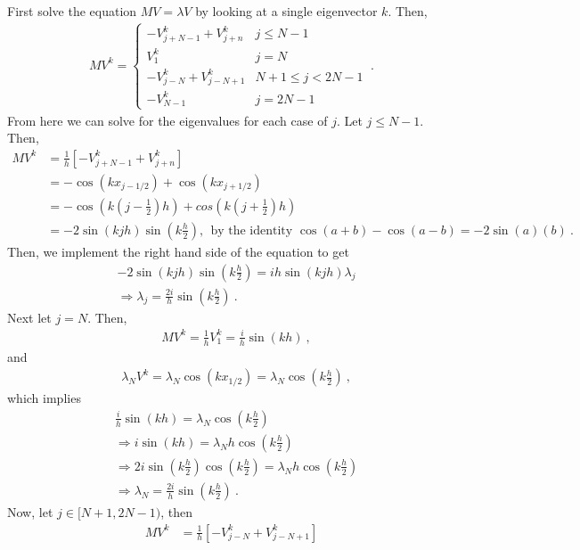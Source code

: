 \begin{questions}
\begin{solution}
First solve the equation $MV = \lambda V$ by looking at a single eigenvector $k$. Then,
\begin{align*}
MV^k = \begin{cases} 
-V_{j+N-1}^k + V_{j+n}^k & j \leq N-1 \\
V_1^k & j=N \\
-V_{j-N}^k + V_{j-N+1}^k & N+1 \leq j < 2N-1 \\
-V_{N-1}^k & j = 2N-1
\end{cases}~.
\end{align*}
From here we can solve for the eigenvalues for each case of $j$. Let $j \leq N-1$. Then,
\begin{align*}
MV^k &= \frac{1}{h}\left[-V_{j+N-1}^k + V_{j+n}^k\right] \\ 
&= -\cos(kx_{j-1/2}) + \cos(kx_{j+1/2}) \\
& = -\cos\left(k\left(j-\frac{1}{2}\right)h\right)+cos\left(k\left(j+\frac{1}{2}\right)h\right) \\
& = -2\sin(kjh)\sin\left(k\frac{h}{2}\right),~~\text{by the identity }\cos(a+b) - \cos(a - b) = -2\sin(a)(b)~.
\end{align*}
Then, we implement the right hand side of the equation to get
\begin{align*}
&-2\sin(kjh)\sin\left(k\frac{h}{2}\right) = ih\sin(kjh)\lambda_j \\ &\Rightarrow \lambda_j = \frac{2i}{h}\sin\left(k\frac{h}{2}\right)~.
\end{align*}
Next let $j = N$. Then,
\begin{align*}
& MV^k = \frac{1}{h}V_1^k = \frac{i}{h}\sin(kh)~,
\end{align*}
and
\begin{align*}
& \lambda_NV^k = \lambda_N\cos(kx_{1/2}) = \lambda_N\cos\left(k\frac{h}{2}\right)~,
\end{align*}
which implies
\begin{align*}
& \frac{i}{h}\sin(kh) = \lambda_N\cos\left(k\frac{h}{2}\right) \\
& \Rightarrow i\sin(kh) = \lambda_Nh\cos\left(k\frac{h}{2}\right) \\
& \Rightarrow 2i\sin\left(k\frac{h}{2}\right)\cos\left(k\frac{h}{2}\right) = \lambda_Nh \cos\left(k\frac{h}{2}\right) \\
& \Rightarrow \lambda_N =\frac{2i}{h}\sin\left(k\frac{h}{2}\right)~.
\end{align*}
Now, let $j \in [N+1,2N-1)$, then
\begin{align*}
MV^k &= \frac{1}{h}\left[-V_{j-N}^k + V_{j-N+1}^k \right]\\ 

\end{align*}
\end{solution}
\end{questions}
